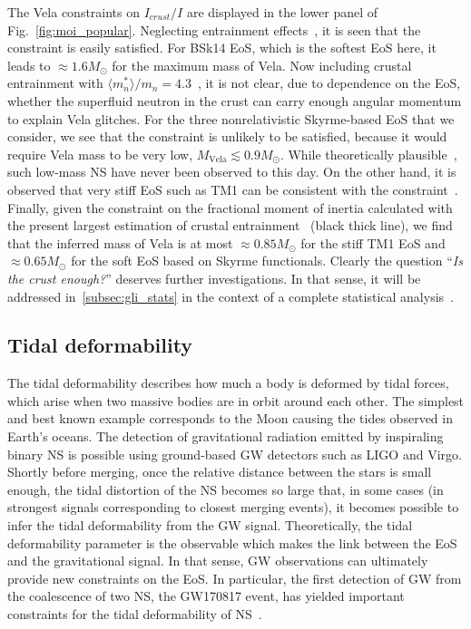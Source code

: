 The Vela constraints on $I_{crust}/I$ are displayed in the lower panel of 
Fig.~\ref{fig:moi_popular}. Neglecting entrainment effects~\cite{Link1999}, it
is seen that the constraint is easily satisfied. For BSk14 EoS, which is the
softest EoS here, it leads to $\approx 1.6M_\odot$ for the maximum mass of 
Vela. Now including crustal entrainment with $\langle m_n^*\rangle/m_n =
4.3$~\cite{Andersson2012}, it is not clear, due to dependence on the EoS, 
whether the superfluid neutron in the crust can carry enough angular momentum 
to explain Vela glitches. For the three nonrelativistic Skyrme-based EoS that 
we consider, we see that the constraint is unlikely to be satisfied, because it
would require Vela mass to be very low, $M_{\text{Vela}} \lesssim 0.9M_\odot$.
While theoretically plausible~\cite{Haensel2007}, such low-mass NS have never 
been observed to this day. On the other hand, it is observed that very stiff 
EoS such as TM1 can be consistent with the constraint~\cite{Piekarewicz2014}.
Finally, given the constraint on the fractional moment of inertia calculated 
with the present largest estimation of crustal entrainment~\cite{Delsate2016}
(black thick line), we find that the inferred mass of Vela is at most 
$\approx 0.85M_\odot$ for the stiff TM1 EoS and $\approx 0.65M_\odot$ for the 
soft EoS based on Skyrme functionals. Clearly the question 
``\textit{Is the crust enough?}'' deserves further investigations. In that 
sense, it will be addressed in~\ref{subsec:gli_stats} in the context of a 
complete statistical analysis~\cite{Carreau2019moi}.

\subsection{Tidal deformability}\label{subsec:tidal} %

The tidal deformability describes how much a body is deformed by tidal forces,
which arise when two massive bodies are in orbit around each other. 
The simplest and best known example corresponds to the Moon causing the tides 
observed in Earth's oceans.
The detection of gravitational radiation emitted by inspiraling binary NS 
is possible using ground-based GW detectors such as LIGO 
and Virgo. 
Shortly before merging, once the relative distance between the stars is small
enough, the tidal distortion of the NS becomes so large that, in some cases (in
strongest signals corresponding to closest merging events), it becomes possible 
to infer the tidal deformability from the GW signal. 
Theoretically, the tidal deformability parameter is the 
observable which makes the link between the EoS and the gravitational signal. 
In that sense, GW observations can ultimately provide new constraints on the 
EoS. In particular, the first detection of GW from the coalescence of two NS, 
the GW170817 event, has yielded important constraints for the tidal 
deformability of NS~\cite{GW1}.

